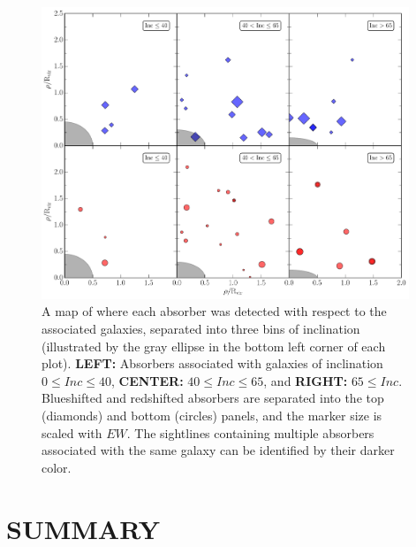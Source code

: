 \documentclass[twocolumn,tighten]{aastex6}
\begin{document}
\begin{figure}[ht!]
        \centering
        \includegraphics[width=0.98\textwidth]{azimuthMap_separate.pdf}
        \caption{\small{A map of where each absorber was detected with respect to the associated galaxies, separated into three bins of inclination (illustrated by the gray ellipse in the bottom left corner of each plot). \textbf{LEFT:} Absorbers associated with galaxies of inclination $0 \leq Inc \le 40$, \textbf{CENTER:} $40 \leq Inc \le 65$, and \textbf{RIGHT: } $65 \leq Inc$. Blueshifted and redshifted absorbers are separated into the top (diamonds) and bottom (circles) panels, and the marker size is scaled with $EW$. The sightlines containing multiple absorbers associated with the same galaxy can be identified by their darker color.}}
        \label{azimuthMap}
        \vspace{5pt}
\end{figure} 



\section{SUMMARY}
\end{document}
